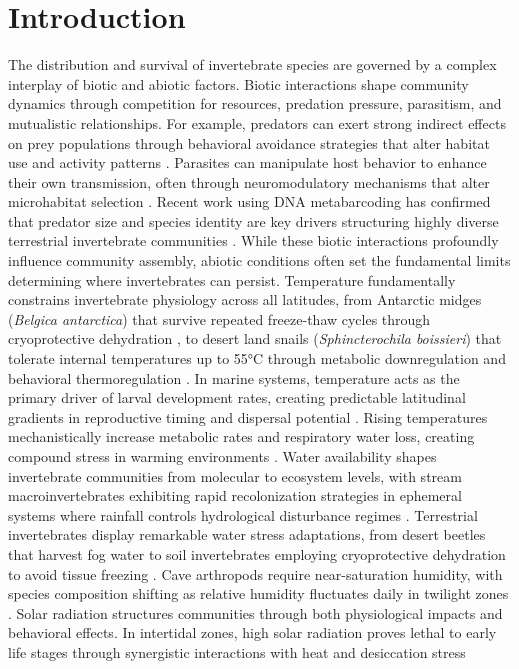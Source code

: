 \usepackage{hyperref}
\usepackage{longtable}

\chapter{Introduction}
\label{ch:introduction}

The distribution and survival of invertebrate species are governed by a complex interplay of biotic and abiotic factors. Biotic interactions shape community dynamics through competition for resources, predation pressure, parasitism, and mutualistic relationships. For example, predators can exert strong indirect effects on prey populations through behavioral avoidance strategies that alter habitat use and activity patterns \citep{blois-heulinDirectIndirectEffects1990}. Parasites can manipulate host behavior to enhance their own transmission, often through neuromodulatory mechanisms that alter microhabitat selection \citep{laffertyComparingMechanismsHost2013}. Recent work using DNA metabarcoding has confirmed that predator size and species identity are key drivers structuring highly diverse terrestrial invertebrate communities \citep{miller-terkuilePredatorPreyInteractions2022}. While these biotic interactions profoundly influence community assembly, abiotic conditions often set the fundamental limits determining where invertebrates can persist. Temperature fundamentally constrains invertebrate physiology across all latitudes, from Antarctic midges (\textit{Belgica antarctica}) that survive repeated freeze-thaw cycles through cryoprotective dehydration \citep{everattResponsesInvertebratesTemperature2015}, to desert land snails (\textit{Sphincterochila boissieri}) that tolerate internal temperatures up to 55°C through metabolic downregulation and behavioral thermoregulation \citep{schweizerSnailsSunStrategies2019}. In marine systems, temperature acts as the primary driver of larval development rates, creating predictable latitudinal gradients in reproductive timing and dispersal potential \citep{hoegh-guldbergTemperatureFoodAvailability1995}. Rising temperatures mechanistically increase metabolic rates and respiratory water loss, creating compound stress in warming environments \citep{chownWaterLossInsects2011}. Water availability shapes invertebrate communities from molecular to ecosystem levels, with stream macroinvertebrates exhibiting rapid recolonization strategies in ephemeral systems where rainfall controls hydrological disturbance regimes \citep{carvalloStructureFunctionalComposition2022}. Terrestrial invertebrates display remarkable water stress adaptations, from desert beetles that harvest fog water \citep{chownWaterLossInsects2011} to soil invertebrates employing cryoprotective dehydration to avoid tissue freezing \citep{holmstrupSupercoolDehydrateExperimental2002}. Cave arthropods require near-saturation humidity, with species composition shifting as relative humidity fluctuates daily in twilight zones \citep{mammolaDayNightSeasonal2018}. Solar radiation structures communities through both physiological impacts and behavioral effects. In intertidal zones, high solar radiation proves lethal to early life stages through synergistic interactions with heat and desiccation stress 